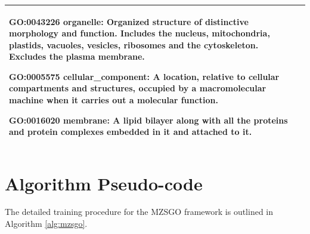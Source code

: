 \documentclass{article}
\begin{document}
\begin{table}[htbp]
\begin{tabularx}{\textwidth}{@{} p{2.5cm} >{\raggedright\arraybackslash}X @{}}
        \textbf{GO:0043226  } \newline
        organelle: Organized structure of distinctive morphology and function. Includes the nucleus, mitochondria, plastids, vacuoles, vesicles, ribosomes and the cytoskeleton. Excludes the plasma membrane. \vspace{1.5ex} \newline
        
        \textbf{GO:0005575 } \newline
        cellular\_component: A location, relative to cellular compartments and structures, occupied by a macromolecular machine when it carries out a molecular function. \vspace{1.5ex} \newline
        
        \textbf{GO:0016020} \newline
        membrane: A lipid bilayer along with all the proteins and protein complexes embedded in it and attached to it. \\
        \bottomrule
    \end{tabularx}
\end{table}

\section{Algorithm Pseudo-code}
The detailed training procedure for the MZSGO framework is outlined in Algorithm \ref{alg:mzsgo}.
\end{document}

